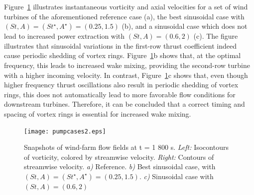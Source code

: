 \documentclass[wes, manuscript]{copernicus}
\begin{document}
Figure~\ref{fig:vorticity_parametersweep} illustrates instantaneous vorticity and axial velocities for a set of wind turbines of the aforementioned reference case (a), the best sinusoidal case with $(St, A) = (St^\star, A^\star)= (0.25, 1.5)$ (b), and a sinusoidal case which does not lead to increased power extraction with $(St, A) = (0.6, 2)$ (c). The figure illustrates that sinusoidal variations in the first-row thrust coefficient indeed cause periodic shedding of vortex rings. Figure~\ref{fig:vorticity_parametersweep}b shows that, at the optimal frequency, this leads to increased wake mixing, providing the second-row turbine with a higher incoming velocity. In contrast, Figure~\ref{fig:vorticity_parametersweep}c shows that, even though higher frequency thrust oscillations also result in periodic shedding of vortex rings, this does not automatically lead to more favorable flow conditions for downstream turbines. Therefore, it can be concluded that a correct timing and spacing of vortex rings is essential for increased wake mixing.
\begin{figure}
	\centering
	\texttt{[image: pumpcases2.eps]}
	\caption{Snapshots of wind-farm flow fields at t = 1 800 s. \emph{Left: } Isocontours of vorticity, colored by streamwise velocity. \emph{Right: } Contours of streamwise velocity. \emph{a)} Reference. \emph{b)} Best sinusoidal case, with $(St , A) = (St^\star, A^\star) = (0.25, 1.5)$. \emph{c)} Sinusoidal case with $(St, A) = (0.6, 2)$ \label{fig:vorticity_parametersweep}  }
\end{figure}
\end{document}
